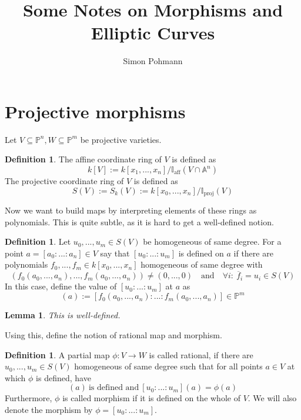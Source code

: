 \documentclass{scrartcl}
\title{Some Notes on Morphisms and Elliptic Curves}
\author{Simon Pohmann}
\newtheorem{lemma}[prop]{Lemma}
\theoremstyle{definition}
\newtheorem{definition}[prop]{Definition}
\begin{document}
\maketitle

\tableofcontents

\section{Projective morphisms}
Let $V \subseteq \mathbb{P}^n, W \subseteq \mathbb{P}^m$ be projective varieties.

\begin{definition}
    The affine coordinate ring of $V$ is defined as 
    \begin{equation*}
        k[V] := k[x_1, ..., x_n]/\mathbb{I}_{\mathrm{aff}}(V \cap \mathbb{A}^n)
    \end{equation*}
    The projective coordinate ring of $V$ is defined as
    \begin{equation*}
        S(V) := S_k(V) := k[x_0, ..., x_n]/\mathbb{I}_{\mathrm{proj}}(V)
    \end{equation*}
\end{definition}
Now we want to build maps by interpreting elements of these rings as polynomials.
This is quite subtle, as it is hard to get a well-defined notion.
\begin{definition}
    Let $u_0, ..., u_m \in S(V)$ be homogeneous of same degree.
    For a point $a = [a_0 : ... : a_n] \in V$ say that $[u_0 : ... : u_m]$ is defined on $a$ if there are polynomials $f_0, ..., f_m \in k[x_0, ..., x_n]$ homogeneous of same degree with
    \begin{equation*}
        (f_0(a_0, ..., a_n), ..., f_m(a_0, ..., a_n)) \neq (0, ..., 0) \quad \text{and} \quad \forall i: \ \overline{f}_i = u_i \in S(V)
    \end{equation*}
    In this case, define the value of $[u_0 : ... : u_m]$ at $a$ as
    \begin{equation*}
        [u_0 : ... : u_m](a) := [f_0(a_0, ..., a_n) : ... : f_m(a_0, ..., a_n)] \in \mathbb{P}^m
    \end{equation*}
\end{definition}
\begin{lemma}
    This is well-defined.
\end{lemma}
Using this, define the notion of rational map and morphism.
\begin{definition}
    A partial map $\phi: V \to W$ is called rational, if there are $u_0, ..., u_m \in S(V)$ homogeneous of same degree such that for all points $a \in V$ at which $\phi$ is defined, have
    \begin{equation*}
        [u_0 : ... : u_m](a) \ \text{is defined and} \ [u_0 : ... : u_m](a) = \phi(a)
    \end{equation*}
    Furthermore, $\phi$ is called morphism if it is defined on the whole of $V$.
    We will also denote the morphism by $\phi = [u_0 : ... : u_m]$.
\end{definition}
\end{document}
